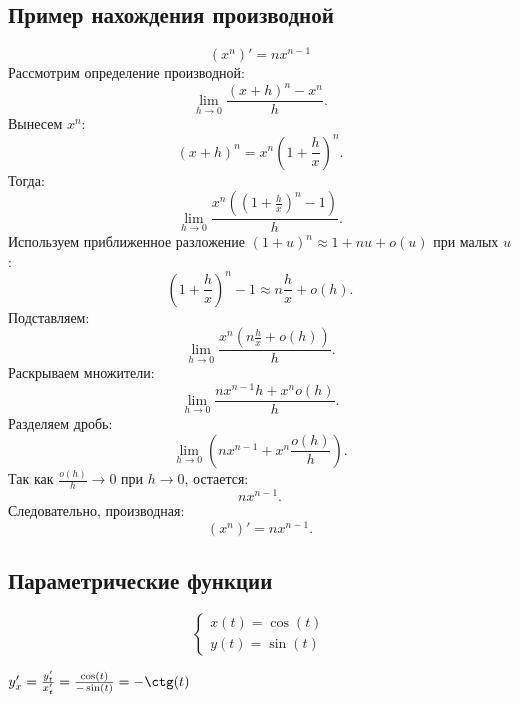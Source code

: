 \subsection*{Пример нахождения производной}
\[
(x^n)' = nx^{n-1}
\]
Рассмотрим определение производной:
\[
\lim_{h \to 0} \frac{(x+h)^n - x^n}{h}.
\]
Вынесем $x^n$:
\[
(x+h)^n = x^n \left(1 + \frac{h}{x}\right)^n.
\]
Тогда:
\[
\lim_{h \to 0} \frac{x^n \left( (1 + \frac{h}{x})^n - 1 \right)}{h}.
\]
Используем приближенное разложение \((1 + u)^n \approx 1 + nu + o(u)\) при малых \( u \):
\[
(1 + \frac{h}{x})^n - 1 \approx n \frac{h}{x} + o(h).
\]
Подставляем:
\[
\lim_{h \to 0} \frac{x^n \left(n \frac{h}{x} + o(h)\right)}{h}.
\]
Раскрываем множители:
\[
\lim_{h \to 0} \frac{n x^{n-1} h + x^n o(h)}{h}.
\]
Разделяем дробь:
\[
\lim_{h \to 0} \left( n x^{n-1} + x^n \frac{o(h)}{h} \right).
\]
Так как \( \frac{o(h)}{h} \to 0 \) при \( h \to 0 \), остается:
\[
n x^{n-1}.
\]
Следовательно, производная:
\[
(x^n)' = n x^{n-1}.
\]

\subsection{Параметрические функции}

\[
\left\{
\begin{array}{l}
    x(t) = \cos(t) \\
    y(t) = \sin(t)
\end{array}
\right.
\]
\begin{center}
    \(
    y'_x = \frac{y'_t}{x'_t} = \frac{\cos(t)}{- \sin(t)} = - \ctg(t)
    \)
\end{center}
